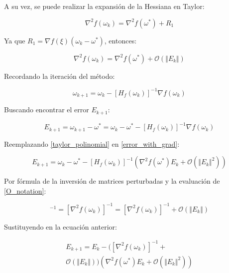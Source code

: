 \documentclass[conference]{IEEEtran}
\begin{document}
A su vez, se puede realizar la expansión de la Hessiana en Taylor:

\begin{equation}
\nabla^{2}f(\omega_{k})=\nabla^{2} f(\omega^{*})+R_{1}
\end{equation}

Ya que $R_{1}=\nabla f(\xi)(\omega_{k}-\omega^{*})$, entonces:

\begin{equation} \label{O_notation}
\nabla^{2}f(\omega_{k})=\nabla^{2} f(\omega^{*})+\mathcal{O}(\Vert E_{k} \Vert)
\end{equation}

Recordando la iteración del método:

\begin{equation}
\omega_{k+1}=\omega_{k}-[H_{f}(\omega_{k})]^{-1}\nabla f(\omega_{k})
\end{equation}

Buscando encontrar el error $E_{k+1}$:

\begin{equation} \label{error_with_grad}
E_{k+1}=\omega_{k+1}-\omega^{*}=\omega_{k}-\omega^{*}-[H_{f}(\omega_{k})]^{-1}\nabla f(\omega_{k})
\end{equation}

Reemplazando \eqref{taylor_polinomial} en \eqref{error_with_grad}:

\begin{equation}
E_{k+1}=\omega_{k}-\omega^{*}-[H_{f}(\omega_{k})]^{-1}(\nabla^{2}f(\omega^{*})E_{k}+\mathcal{O}(\Vert E_{k} \Vert^{2}))
\end{equation}

Por fórmula de la inversión de matrices perturbadas y la evaluación de \eqref{O_notation}:

\begin{equation}
[H_{f}(\omega_{k})]^{-1}=[\nabla^{2}f(\omega_{k})]^{-1}=[\nabla^{2}f(\omega_{k})]^{-1}+\mathcal{O}(\Vert E_{k}\Vert )
\end{equation}

Sustituyendo en la ecuación anterior:

\begin{multline*}
    E_{k+1}=E_{k}-([\nabla^{2}f(\omega_{k})]^{-1}+\\
    \mathcal{O}(\Vert E_{k} \Vert))(\nabla^{2}f(\omega^{*})E_{k}+\mathcal{O}(\Vert E_{k} \Vert^{2}))
\end{multline*}
\end{document}
